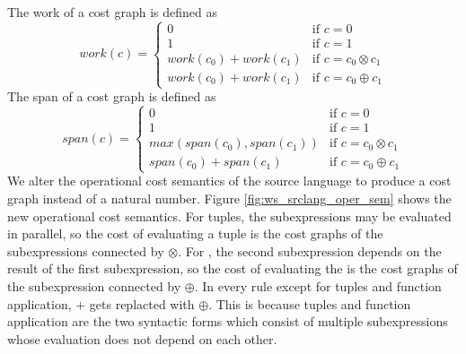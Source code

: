 The work of a cost graph is defined as
%
\begin{equation*}
  work(c) = \begin{cases}
    0 &\text{if } c = 0 \\
    1 &\text{if } c = 1 \\
    work(c_0) + work(c_1) &\text{if } c = c_0 \otimes c_1 \\
    work(c_0) + work(c_1) &\text{if } c = c_0 \oplus c_1
  \end{cases}
\end{equation*}
%
The span of a cost graph is defined as
%
\begin{equation*}
  span(c) = \begin{cases}
    0 &\text{if } c = 0 \\
    1 &\text{if } c = 1 \\
    max(span(c_0), span(c_1)) &\text{if } c = c_0 \otimes c_1 \\
    span(c_0) + span(c_1) &\text{if } c = c_0 \oplus c_1
  \end{cases}
\end{equation*}
%
We alter the operational cost semantics of the source language to produce a cost
graph instead of a natural number. Figure \ref{fig:ws_srclang_oper_sem} shows
the new operational cost semantics. For tuples, the subexpressions may be evaluated
in parallel, so the cost of evaluating a tuple is the cost graphs of the
subexpressions connected by $\otimes$.  For , the second subexpression
depends on the result of the first subexpression, so the cost of evaluating the
 is the cost graphs of the subexpression connected by $\oplus$. In
every rule except for tuples and function application, $+$ gets replacted with
$\oplus$. This is because tuples and function application are the two syntactic
forms which consist of multiple subexpressions whose evaluation does not depend
on each other.
%
